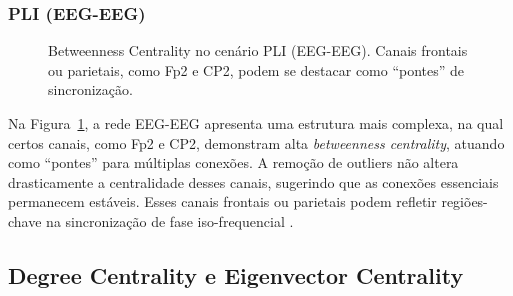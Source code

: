 \subsubsection{PLI (EEG-EEG)}
\begin{figure}[htb]
    \centering
    \quad
    \caption{Betweenness Centrality no cenário PLI (EEG-EEG). Canais frontais ou parietais, como Fp2 e CP2, podem se destacar como “pontes” de sincronização.}
    \label{fig:bc_pli_eegeeg}
\end{figure}

Na Figura~\ref{fig:bc_pli_eegeeg}, a rede EEG-EEG apresenta uma estrutura mais complexa, na qual certos canais, como Fp2 e CP2, demonstram alta \emph{betweenness centrality}, atuando como “pontes” para múltiplas conexões. A remoção de outliers não altera drasticamente a centralidade desses canais, sugerindo que as conexões essenciais permanecem estáveis. Esses canais frontais ou parietais podem refletir regiões-chave na sincronização de fase iso-frequencial \cite{rubinov2010complex}.

\subsection{Degree Centrality e Eigenvector Centrality}

